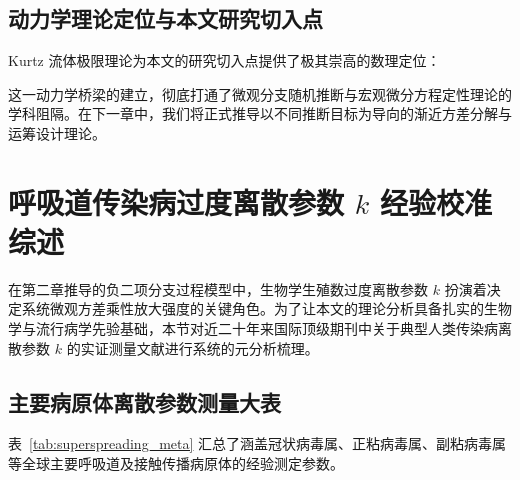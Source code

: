 \subsection{动力学理论定位与本文研究切入点}
Kurtz 流体极限理论为本文的研究切入点提供了极其崇高的数理定位：
\begin{center}
\end{center}
这一动力学桥梁的建立，彻底打通了微观分支随机推断与宏观微分方程定性理论的学科阻隔。在下一章中，我们将正式推导以不同推断目标为导向的渐近方差分解与运筹设计理论。


\section{呼吸道传染病过度离散参数 $k$ 经验校准综述}\label{sec:k_calibration}

在第二章推导的负二项分支过程模型中，生物学生殖数过度离散参数 $k$ 扮演着决定系统微观方差乘性放大强度的关键角色。为了让本文的理论分析具备扎实的生物学与流行病学先验基础，本节对近二十年来国际顶级期刊中关于典型人类传染病离散参数 $k$ 的实证测量文献进行系统的元分析梳理。

\subsection{主要病原体离散参数测量大表}
表~\ref{tab:superspreading_meta} 汇总了涵盖冠状病毒属、正粘病毒属、副粘病毒属等全球主要呼吸道及接触传播病原体的经验测定参数。

